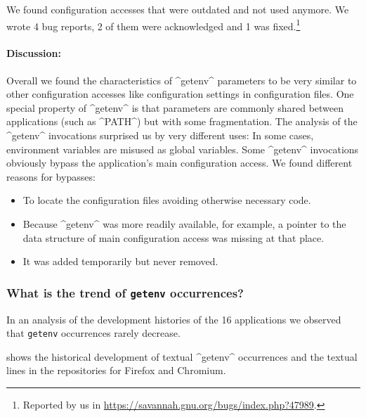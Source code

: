 We found configuration accesses that were outdated and not used anymore.
We wrote 4 bug reports, 2 of them were acknowledged and 1 was fixed.\footnote{Reported by us in \url{https://savannah.gnu.org/bugs/index.php?47989}.}

\paragraph{Discussion:}
Overall we found the characteristics of ^getenv^ parameters to be very similar to other configuration accesses like configuration settings in configuration files.
One special property of ^getenv^ is that parameters are commonly shared between applications (such as ^PATH^) but with some fragmentation.
The analysis of the ^getenv^ invocations surprised us by very different uses:
In some cases, environment variables are misused as global variables.
Some ^getenv^ invocations obviously bypass the application's main configuration access.
We found different reasons for bypasses:
\begin{itemize}
\item To locate the configuration files avoiding otherwise necessary  code.
\item Because ^getenv^ was more readily available, for example, a pointer to the data structure of main configuration access was missing at that place.
\item It was added temporarily but never removed.
\end{itemize}


\subsubsection{What is the trend of \texttt{getenv} occurrences?}

\begin{finding}
In an analysis of the development histories of the 16 applications we observed that \texttt{getenv} occurrences rarely decrease.
\end{finding}

 shows the historical development of textual ^getenv^ occurrences and the textual lines in the repositories for Firefox and Chromium.

